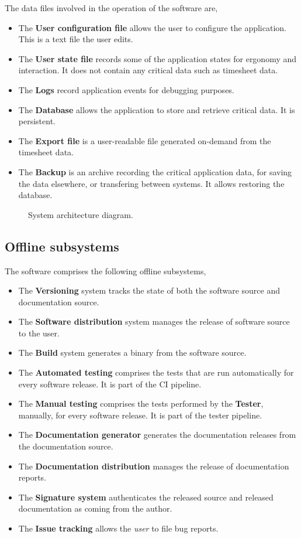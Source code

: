 The data files involved in the operation of the software are,
\begin{itemize}
\item The \textbf{User configuration file} allows the user to configure the
  application. This is a text file the user edits.
\item The \textbf{User state file} records some of the application states
  for ergonomy and interaction. It does not contain any critical data such
  as timesheet data.
\item The \textbf{Logs} record application events for debugging purposes.
\item The \textbf{Database} allows the application to store and retrieve
  critical data. It is persistent.
\item The \textbf{Export file} is a user-readable file generated on-demand
  from the timesheet data.
\item The \textbf{Backup} is an archive recording the critical application
  data, for saving the data elsewhere, or transfering between systems.
  It allows restoring the database.
\end{itemize}

\begin{figure}
  
  \caption{\label{fig:arch-diagram} System architecture diagram.}
\end{figure}

\subsection{Offline subsystems}
The software comprises the following offline subsystems,
\begin{itemize}
\item The \textbf{Versioning} system tracks the state of both the software
  source and documentation source.
\item The \textbf{Software distribution} system manages the release of
  software source to the user.
\item The \textbf{Build} system generates a binary from the software source.
\item The \textbf{Automated testing} comprises the tests that are run
  automatically for every software release. It is part of the \gls{CI} pipeline.
\item The \textbf{Manual testing} comprises the tests performed by the
  \textbf{Tester}, manually, for every software release. It is part of the
  tester pipeline.
\item The \textbf{Documentation generator} generates the documentation
  releases from the documentation source.
\item The \textbf{Documentation distribution} manages the release of
  documentation reports.
\item The \textbf{Signature system} authenticates the released source and
  released documentation as coming from the author.
\item The \textbf{Issue tracking} allows the \emph{user} to file bug reports.
\end{itemize}

